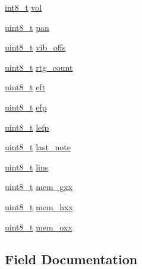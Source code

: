 \begin{DoxyCompactItemize}
\hyperlink{inttypes_8h_aef44329758059c91c76d334e8fc09700}{int8\+\_\+t} \hyperlink{structvchn__s_a855108d510f4ea3649e30ec51683be15}{vol}
\item 
\hyperlink{inttypes_8h_aba7bc1797add20fe3efdf37ced1182c5}{uint8\+\_\+t} \hyperlink{structvchn__s_aa9e1f82538572839ec005f2e986ecb19}{pan}
\item 
\hyperlink{inttypes_8h_aba7bc1797add20fe3efdf37ced1182c5}{uint8\+\_\+t} \hyperlink{structvchn__s_a1f1f455fd6b50be9d1ac5d8c205b7e50}{vib\+\_\+offs}
\item 
\hyperlink{inttypes_8h_aba7bc1797add20fe3efdf37ced1182c5}{uint8\+\_\+t} \hyperlink{structvchn__s_a9431f0294da3f02cc0ce5a0d100a2f4b}{rtg\+\_\+count}
\item 
\hyperlink{inttypes_8h_aba7bc1797add20fe3efdf37ced1182c5}{uint8\+\_\+t} \hyperlink{structvchn__s_a9376074b0b76c7d748e45fa6fd7ea588}{eft}
\item 
\hyperlink{inttypes_8h_aba7bc1797add20fe3efdf37ced1182c5}{uint8\+\_\+t} \hyperlink{structvchn__s_a4257c645ab096f2cfe84a28e5e865dd2}{efp}
\item 
\hyperlink{inttypes_8h_aba7bc1797add20fe3efdf37ced1182c5}{uint8\+\_\+t} \hyperlink{structvchn__s_a7fc39834e20f7641885b2812fc3eead3}{lefp}
\item 
\hyperlink{inttypes_8h_aba7bc1797add20fe3efdf37ced1182c5}{uint8\+\_\+t} \hyperlink{structvchn__s_ac4077127df43df8f7e9ec1e53e04a6c9}{last\+\_\+note}
\item 
\hyperlink{inttypes_8h_aba7bc1797add20fe3efdf37ced1182c5}{uint8\+\_\+t} \hyperlink{structvchn__s_a4bb8d87b849f8c53f79e7a0b5202d500}{lins}
\item 
\hyperlink{inttypes_8h_aba7bc1797add20fe3efdf37ced1182c5}{uint8\+\_\+t} \hyperlink{structvchn__s_ab87191a7cb5e3c35ba062e668614783f}{mem\+\_\+gxx}
\item 
\hyperlink{inttypes_8h_aba7bc1797add20fe3efdf37ced1182c5}{uint8\+\_\+t} \hyperlink{structvchn__s_a402b761472a2b5d61b51aef032a06004}{mem\+\_\+hxx}
\item 
\hyperlink{inttypes_8h_aba7bc1797add20fe3efdf37ced1182c5}{uint8\+\_\+t} \hyperlink{structvchn__s_a6aa5457b8a351e8fb98aed11ddbeca9d}{mem\+\_\+oxx}
\end{DoxyCompactItemize}


\subsection{Field Documentation}
\hypertarget{structvchn__s_a4257c645ab096f2cfe84a28e5e865dd2}{}
